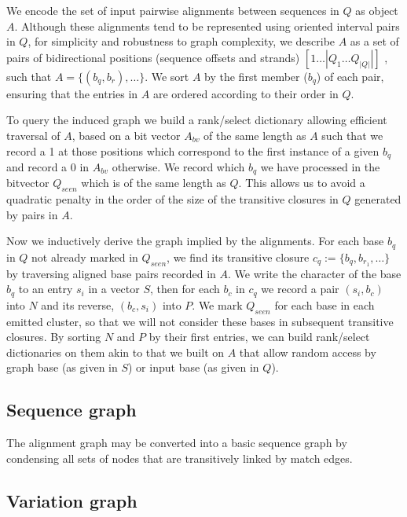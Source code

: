 \documentclass{bioinfo}
\begin{document}
We encode the set of input pairwise alignments between sequences in $Q$ as object $A$.
Although these alignments tend to be represented using oriented interval pairs in $Q$, for simplicity and robustness to graph complexity, we describe $A$ as a set of pairs of bidirectional positions (sequence offsets and strands) $[1 \ldots |Q_1 \ldots Q_{|Q|}|]$ , such that $A = \{ (b_{q}, b_{r}), \ldots \}$.
We sort $A$ by the first member ($b_{q}$) of each pair, ensuring that the entries in $A$ are ordered according to their order in $Q$.

    To query the induced graph we build a rank/select dictionary allowing efficient traversal of $A$, based on a bit vector $A_{bv}$ of the same length as $A$ such that we record a 1 at those positions which correspond to the first instance of a given $b_{q}$ and record a 0 in $A_{bv}$ otherwise.
    We record which $b_{q}$ we have processed in the bitvector $Q_{seen}$ which is of the same length as $Q$.
    This allows us to avoid a quadratic penalty in the order of the size of the transitive closures in $Q$ generated by pairs in $A$.

Now we inductively derive the graph implied by the alignments.
For each base $b_{q}$ in $Q$ not already marked in $Q_{seen}$, we find its transitive closure $c_{q} := \{b_{q}, b_{r_{1}}, \ldots \}$ by traversing aligned base pairs recorded in $A$.
We write the character of the base $b_{q}$ to an entry $s_i$ in a vector $S$, then for each $b_{c}$ in $c_{q}$ we record a pair $(s_{i}, b_{c})$ into $N$ and its reverse, $(b_{c}, s_{i})$ into $P$.
We mark $Q_{seen}$ for each base in each emitted cluster, so that we will not consider these bases in subsequent transitive closures.
By sorting $N$ and $P$ by their first entries, we can build rank/select dictionaries on them akin to that we built on $A$ that allow random access by graph base (as given in $S$) or input base (as given in $Q$).



\subsection{Sequence graph}

The alignment graph may be converted into a basic sequence graph by condensing all sets of nodes that are transitively linked by match edges.



\subsection{Variation graph}
\end{document}
